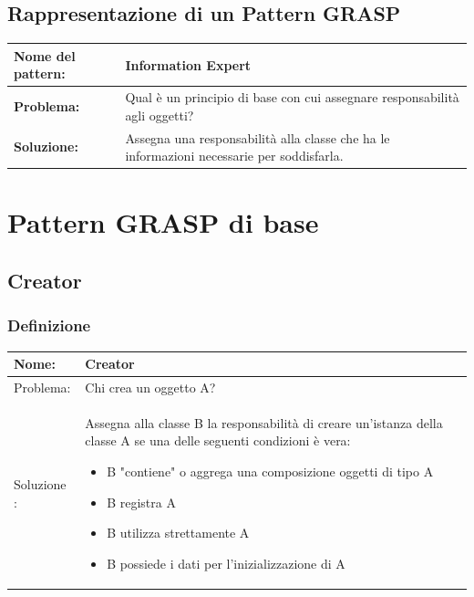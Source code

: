 \section{Rappresentazione di un Pattern GRASP}
\begin{tabularx}{\textwidth}{@{} l X @{}}
\toprule
\textbf{Nome del pattern:} & \textbf{Information Expert} \\ \midrule
\textbf{Problema:}         & Qual è un principio di base con cui assegnare responsabilità agli oggetti? \\ \midrule
\textbf{Soluzione:}        & Assegna una responsabilità alla classe che ha le informazioni necessarie per soddisfarla. \\ 
\bottomrule
\end{tabularx}

\chapter{Pattern GRASP di base}
\section{Creator}
\subsection{Definizione}
\begin{table}[htbp]
    \renewcommand{\arraystretch}{1.8}
    \begin{tabularx}{\textwidth}{@{} p{2.8cm} X @{}}
        \hline
        Nome: & \textbf{Creator} \\
        \hline
        Problema: &  Chi crea un oggetto A?\\
        \hline
        Soluzione : &
        Assegna alla classe B la responsabilità di creare un'istanza della classe A se una delle seguenti condizioni è vera:
        \begin{itemize}
            \item B "contiene" o aggrega una composizione oggetti di tipo A
            \item B registra A
            \item B utilizza strettamente A
            \item B possiede i dati per l'inizializzazione di A
        \end{itemize} \\
        \hline
    \end{tabularx}
\end{table}

